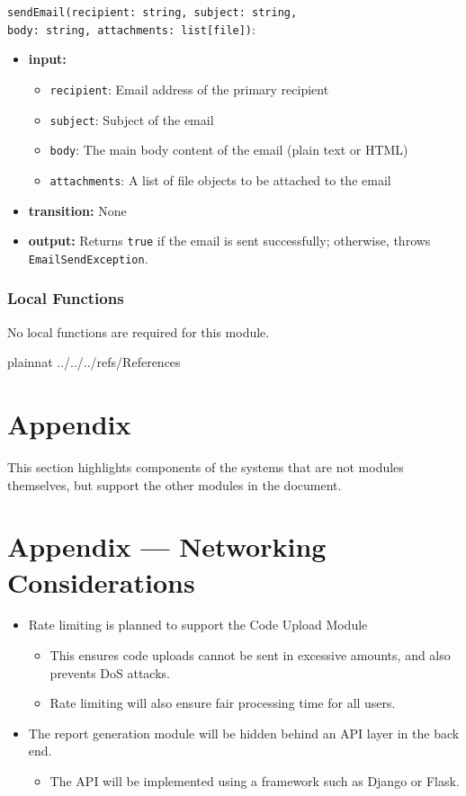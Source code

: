 \documentclass[12pt, titlepage]{article}
\begin{document}
\noindent \texttt{sendEmail(recipient: string, subject: string, \\
    body: string, attachments: list[file])}:
\begin{itemize}
    \item \textbf{input:} 
    \begin{itemize}
        \item \texttt{recipient}: Email address of the primary recipient
        \item \texttt{subject}: Subject of the email
        \item \texttt{body}: The main body content of the email (plain text or HTML)
        \item \texttt{attachments}: A list of file objects to be attached to the email
    \end{itemize}
    \item \textbf{transition:} None
    \item \textbf{output:} Returns \texttt{true} if the email is sent successfully; otherwise, throws \texttt{EmailSendException}.
\end{itemize}


\subsubsection{Local Functions}
No local functions are required for this module.

\newpage

 {plainnat}
 {../../../refs/References}

\newpage

\section{Appendix} \label{Appendix}
This section highlights components of the systems that are not modules themselves, but support the other modules in the document.

\section*{Appendix --- Networking Considerations}
\begin{itemize}
    \item Rate limiting is planned to support the Code Upload Module
    \begin{itemize}
        \item This ensures code uploads cannot be sent in excessive amounts, and also prevents DoS attacks.
        \item Rate limiting will also ensure fair processing time for all users.
    \end{itemize}
    \item The report generation module will be hidden behind an API layer in the back end.
    \begin{itemize}
        \item The API will be implemented using a framework such as Django or Flask.
    \end{itemize}
\end{itemize}
\end{document}
